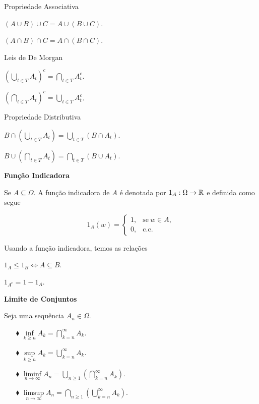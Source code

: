 Propriedade Associativa

$(A\cup B)\cup C= A \cup ( B \cup C)$.

$(A\cap B)\cap C= A \cap ( B \cap C)$.

\vspace*{1cm}
Leis de De Morgan

$\left( \displaystyle\bigcup_{t \in T}{A_t} \right)^c = \displaystyle\bigcap_{t \in T}{A_t^c}$.

$\left( \displaystyle\bigcap_{t \in T}{A_t} \right)^c = \displaystyle\bigcup_{t \in T}{A_t^c}$.


\vspace*{1cm}
Propriedade Distributiva

$B \cap \left( \displaystyle\bigcup_{t \in T}{A_t} \right) = \displaystyle\bigcup_{t \in T}{(B\cap A_t)} $.

$B \cup \left( \displaystyle\bigcap_{t \in T}{A_t} \right) = \displaystyle\bigcap_{t \in T}{(B\cup A_t)} $.

\vspace*{1cm}
\textbf{Função Indicadora}

Se $A \subseteq \Omega$. A função indicadora de $A$ é denotada por $1_A: \Omega \to \mathbb{R}$ e definida 
como segue

$$
	1_A(w) =
	\begin{cases}
		1, & \text{se}\ w \in A, \\
		0, & \text{c.c.}
	\end{cases}
$$

\begin{observacao} Usando a função indicadora, temos as relações

$1_A \leqslant 1_B \Leftrightarrow A \subseteq B$.

$1_{A^c}= 1- 1_A$.
\end{observacao}


\vspace*{1cm}
\textbf{Limite de Conjuntos}

Seja uma sequência $A_n \in \Omega$.
\begin{enumerate}
\item[$\blacklozenge$] $\inf \limits_{k\geqslant n} A_k = \displaystyle\bigcap_{k=n}^{\infty}{A_k}$.
\item[$\blacklozenge$] $\sup \limits_{k\geqslant n} A_k = \displaystyle\bigcup_{k=n}^{\infty}{A_k}$.
\item[$\blacklozenge$] 
	$\liminf \limits_{n \to \infty} A_n 
	= 
	\displaystyle\bigcup_ {n\geqslant 1} \left(\displaystyle\bigcap_{k=n}^{\infty}{A_k} \right)$.
\item[$\blacklozenge$] 
	$\limsup \limits_{n \to \infty} A_n 
	= 
	\displaystyle\bigcap_ {n\geqslant 1} \left(\displaystyle\bigcup_{k=n}^{\infty}{A_k} \right)$.
\end{enumerate}

